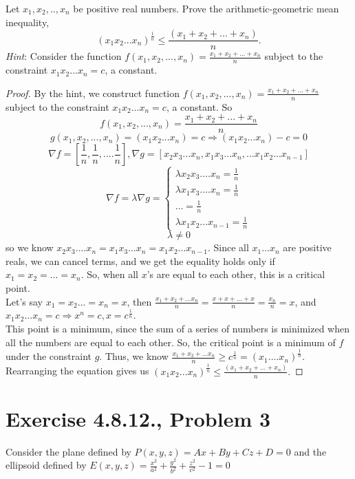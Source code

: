 \documentclass{article}
\begin{document}
Let $x_1, x_2,.., x_n$ be positive real numbers. Prove the arithmetic-geometric mean inequality,
$$(x_1x_2 . . . x_n)^{\frac{1}{n}} \leq \frac{(x_1 + x_2 + ... + x_n)}{n} .$$
\textit{Hint}: Consider the function $f(x_1, x_2, ... , x_n) = \frac{x_1+x_2+...+x_n}{n}$ subject to the constraint $x_1x_2... x_n = c$, a constant.

\begin{proof}
By the hint, we construct function $f(x_1, x_2, ... , x_n) = \frac{x_1+x_2+...+x_n}{n}$ subject to the constraint $x_1x_2... x_n = c$, a constant. So 
$$f(x_1, x_2, ... , x_n) = \frac{x_1+x_2+...+x_n}{n}$$
$$ g(x_1, x_2, ... , x_n)=(x_1x_2 ... x_n)=c \Rightarrow (x_1x_2 ... x_n)-c =0$$
$$\nabla f= [\frac{1}{n}, \frac{1}{n}, ....\frac{1}{n}],  \nabla g=[x_2x_3...x_n,x_1x_3...x_n, ...x_1x_2...x_{n-1}]$$
$$\nabla f=\lambda \nabla g=\begin{cases}
    \lambda x_2x_3....x_n = \frac{1}{n} \\
    \lambda x_1x_3....x_n = \frac{1}{n}\\
    ... = \frac{1}{n} \\
    \lambda x_1x_2...x_{n-1}=\frac{1}{n}
\end{cases}$$
$$\lambda \neq 0 $$ so we know $x_2x_3....x_n=x_1x_3...x_n=x_1x_2...x_{n-1}$. Since all $x_1...x_n$ are positive reals, we can cancel terms, and we get the equality holds only if $x_1=x_2=...=x_n$. So, when all $x$'s are equal to each other, this is a critical point. \\
Let's say $x_1=x_2...=x_n=x$, then $\frac{x_1+x_2+...x_n}{n}=\frac{x+x+...+x}{n}=\frac{x_n}{n}=x$, and $x_1x_2...x_n=c \Rightarrow x^n=c, x =c^\frac{1}{n}$. \\
This point is a minimum, since the sum of a series of numbers is minimized when all the numbers are equal to each other. So, the critical point is a minimum of $f$ under the constraint $g.$ Thus, we know $\frac{x_1+x_2+...x_n}{n} \geq c ^\frac{1}{n}=(x_1....x_n)^\frac{1}{n}.$ Rearranging the equation gives us $(x_1x_2 . . . x_n)^{\frac{1}{n}} \leq \frac{(x_1 + x_2 + ... + x_n)}{n} .$
\end{proof}

\clearpage

\section*{Exercise 4.8.12., Problem 3}
Consider the plane defined by $P (x, y, z) = Ax + By + Cz + D = 0$ and the ellipsoid defined by $E(x, y, z) = \frac{x^2}{a^2}+ \frac{y^2}{b^2} +\frac{z^2}{c^2}-1=0$
\end{document}
